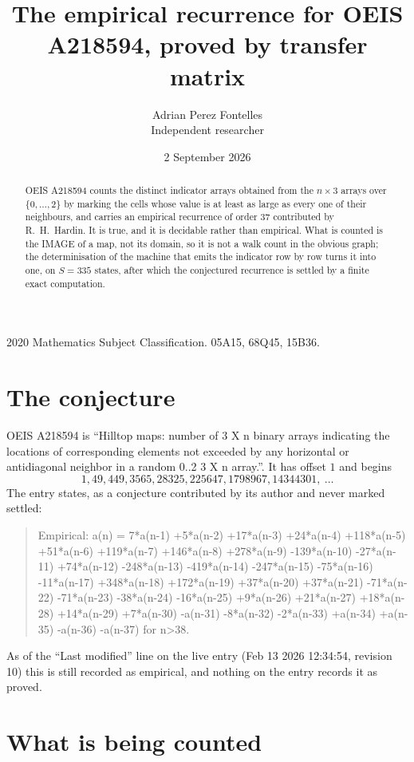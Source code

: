 \documentclass[11pt,a4paper]{article}
\title{The empirical recurrence for OEIS A218594, proved by transfer matrix}
\author{Adrian Perez Fontelles\\ \small Independent researcher}
\date{2 September 2026}
\theoremstyle{plain}
\theoremstyle{definition}
\begin{document}
\maketitle

\begin{abstract}
OEIS A218594 counts the distinct indicator arrays obtained from the $n\times3$ arrays over
$\{0,\dots,2\}$ by marking the cells whose value is at least as large as every one of their neighbours, and carries an
empirical recurrence of order $37$ contributed by R.~H.~Hardin. It is true, and it is
decidable rather than empirical. What is counted is the IMAGE of a map, not its domain, so it
is not a walk count in the obvious graph; the determinisation of the machine that emits the
indicator row by row turns it into one, on $S=335$ states, after which the conjectured
recurrence is settled by a finite exact computation.
\end{abstract}

\noindent\small 2020 Mathematics Subject Classification. 05A15, 68Q45, 15B36.\normalsize

\section{The conjecture}

OEIS A218594 is ``Hilltop maps: number of 3 X n binary arrays indicating the locations of corresponding elements not exceeded by any horizontal or antidiagonal neighbor in a random 0..2 3 X n array.''. It has offset $1$ and begins
\[
1, 49, 449, 3565, 28325, 225647, 1798967, 14344301,\ \dots
\]
The entry states, as a conjecture contributed by its author and never marked settled:
\begin{quote}
Empirical: a(n) = 7*a(n-1) +5*a(n-2) +17*a(n-3) +24*a(n-4) +118*a(n-5) +51*a(n-6) +119*a(n-7) +146*a(n-8) +278*a(n-9) -139*a(n-10) -27*a(n-11) +74*a(n-12) -248*a(n-13) -419*a(n-14) -247*a(n-15) -75*a(n-16) -11*a(n-17) +348*a(n-18) +172*a(n-19) +37*a(n-20) +37*a(n-21) -71*a(n-22) -71*a(n-23) -38*a(n-24) -16*a(n-25) +9*a(n-26) +21*a(n-27) +18*a(n-28) +14*a(n-29) +7*a(n-30) -a(n-31) -8*a(n-32) -2*a(n-33) +a(n-34) +a(n-35) -a(n-36) -a(n-37) for n>38.
\end{quote}
As of the ``Last modified'' line on the live entry (Feb 13 2026 12:34:54, revision 10) this is still
recorded as empirical, and nothing on the entry records it as proved.

\section{What is being counted}
\end{document}
